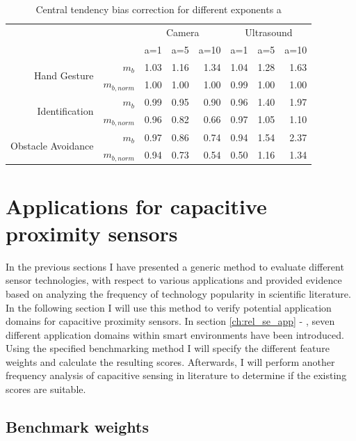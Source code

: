 \begin{table}[htbp]
  \centering
  \caption{Central tendency bias correction for different exponents a}
    \begin{tabular}{rrrrrrrr}
    \toprule
          &       & \multicolumn{3}{c}{Camera} & \multicolumn{3}{c}{Ultrasound} \\
          &       & a=1   & a=5   & a=10  & a=1   & a=5   & a=10 \\
    \midrule
    \multirow{2}[0]{*}{Hand Gesture} & $m_b$   & 1.03  & 1.16  & 1.34  & 1.04  & 1.28  & 1.63 \\
          & $m_{b,norm}$ & 1.00  & 1.00  & 1.00  & 0.99  & 1.00  & 1.00 \\
    \multirow{2}[0]{*}{Identification} & $m_b$   & 0.99  & 0.95  & 0.90  & 0.96  & 1.40  & 1.97 \\
          & $m_{b,norm}$ & 0.96  & 0.82  & 0.66  & 0.97  & 1.05  & 1.10 \\
    \multirow{2}[0]{*}{Obstacle Avoidance} & $m_b$  & 0.97  & 0.86  & 0.74  & 0.94  & 1.54  & 2.37 \\
          & $m_{b,norm}$ & 0.94  & 0.73  & 0.54  & 0.50  & 1.16  & 1.34 \\
    \bottomrule
    \end{tabular}%

  \label{tab:bench_bias_corr}%
\end{table}%


\section{Applications for capacitive proximity sensors}
In the previous sections I have presented a generic method to evaluate different sensor technologies, with respect to various applications and provided evidence based on analyzing the frequency of technology popularity in scientific literature. In the following section I will use this method to verify potential application domains for capacitive proximity sensors. In section \ref{ch:rel_se_app} - \emph{}, seven different application domains within smart environments have been introduced. Using the specified benchmarking method I will specify the different feature weights and calculate the resulting scores. Afterwards, I will perform another frequency analysis of capacitive sensing in literature to determine if the existing scores are suitable. 

\subsection{Benchmark weights}

